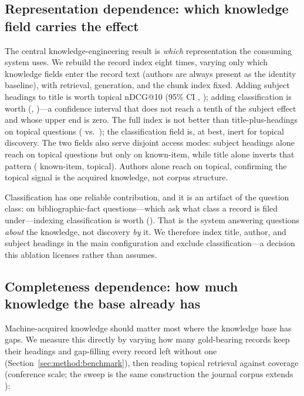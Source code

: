 \subsection{Representation dependence: which knowledge field carries the effect}

The central knowledge-engineering result is \emph{which} representation the
consuming system uses. We rebuild the record index eight times, varying only
which knowledge fields enter the record text (authors are always present as
the identity baseline), with retrieval, generation, and the chunk index
fixed. Adding subject headings to title is worth \AblSubjGain{} topical
nDCG@10 (95\% CI \AblSubjCI{}, \AblSubjP{}); adding classification is worth
\AblDdcGain{} (\AblDdcCI{}, \AblDdcP{})---a confidence interval that does
not reach a tenth of the subject effect and whose upper end is zero. The
full index is not better than title-plus-headings on topical questions
(\AblFullTopical{} vs.\ \AblTitleSubjTopical{}); the classification field
is, at best, inert for topical discovery. The two fields also serve
disjoint access modes: subject headings alone reach \AblSubjOnlyTopical{}
on topical questions but only \AblSubjOnlyKnown{} on known-item, while
title alone inverts that pattern (\AblTitleOnlyKnown{} known-item,
\AblTitleOnlyTopical{} topical). Authors alone reach \AblAuthorsTopical{}
on topical, confirming the topical signal is the acquired knowledge, not
corpus structure.

Classification has one reliable contribution, and it is an artifact of the
question class: on bibliographic-fact questions---which ask what class a
record is filed under---indexing classification is worth
\AblDdcBibGain{} (\AblDdcBibP{}). That is the system answering questions
\emph{about} the knowledge, not discovery \emph{by} it. We therefore index
title, author, and subject headings in the main configuration and exclude
classification---a decision this ablation licenses rather than assumes.

\subsection{Completeness dependence: how much knowledge the base already has}

Machine-acquired knowledge should matter most where the knowledge base has
gaps. We measure this directly by varying how many gold-bearing records keep
their headings and gap-filling every record left without one
(Section~\ref{sec:method:benchmark}), then reading topical retrieval
against coverage (conference scale; the sweep is the same construction the
journal corpus extends ):

